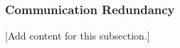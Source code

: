 
\subsubsection{Communication Redundancy}
\label{subsubsec:design_2_3_7_communication_redundancy}

[Add content for this subsection.]
